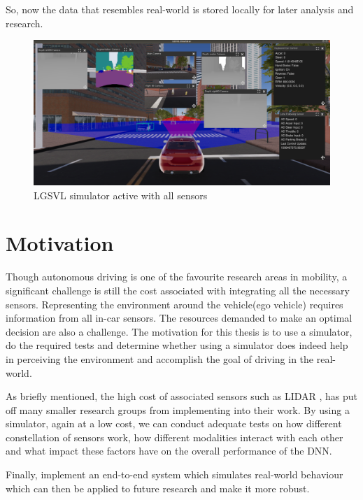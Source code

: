 So, now the data that resembles real-world is stored locally for later analysis and
research.

\begin{figure}[h]
    \begin{center}
        \includegraphics[width = \textwidth]{figures/png/intro/LGSVL_2_scrot_2020-08-26_20-46-55.png}
    \end{center}
    \caption{LGSVL\cite{LGSVL} simulator active with all sensors}
        \label{fig:LGSVL_constellation_sensors}
\end{figure}

\section{Motivation}

Though autonomous driving is one of the favourite research areas in mobility, 
a significant challenge is still the cost associated with integrating all the necessary sensors.  
Representing the environment around the vehicle(ego vehicle) requires information from all in-car sensors. 
The resources demanded to make an optimal decision are also a challenge. The motivation for this thesis is 
to use a simulator, do the required tests and 
determine whether using a simulator does indeed help in perceiving the environment 
and accomplish the goal of driving in the real-world. 

As briefly mentioned, the high cost of associated sensors such as LIDAR
\cite{VergeReportLidar},  has put off many smaller research groups from implementing into their
work. By using a simulator, again at a low cost, we can conduct adequate tests 
on how different constellation of sensors work, how different modalities interact with each other and 
what impact these factors have on the overall performance of the DNN.

Finally, implement an end-to-end system which simulates real-world behaviour which can
then be applied to future research and make it more robust.

